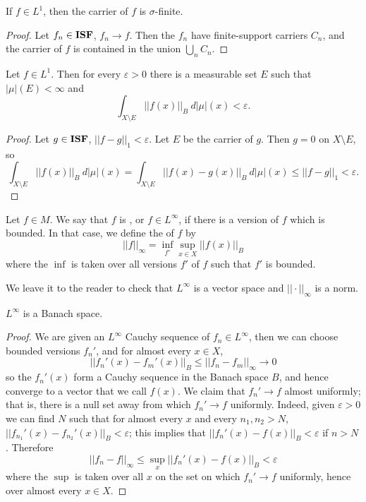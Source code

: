 \begin{lemma}
If $f \in L^1$, then the carrier of $f$ is $\sigma$-finite.
\end{lemma}
\begin{proof}
Let $f_{n} \in \mathbf{ISF}$, $f_{n} \to f$. Then the $f_{n}$ have finite-support carriers $C_{n}$, and the carrier of $f$ is contained in the union $\bigcup_{n} C_{n}$.
\end{proof}

\begin{lemma}
\label{L1 functions almost have finite carrier}
Let $f \in L^1$. Then for every $\varepsilon > 0$ there is a measurable set $E$ such that $|\mu|(E) < \infty$ and
\[\int_{X \setminus E} ||f(x)||_{B} ~d|\mu|(x) < \varepsilon.\]
\end{lemma}
\begin{proof}
Let $g \in \mathbf{ISF}$, $||f - g||_1 < \varepsilon$.
Let $E$ be the carrier of $g$. Then $g = 0$ on $X \setminus E$, so
\[\int_{X \setminus E} ||f(x)||_{B} ~d|\mu|(x) = \int_{X \setminus E} ||f(x) - g(x)||_{B} ~d|\mu|(x) \leq ||f - g||_1 < \varepsilon.\]
\end{proof}

\begin{definition}
Let $f \in M$. We say that $f$ is , or $f \in L^\infty$, if there is a version of $f$ which is bounded.
In that case, we define the  of $f$ by
\[||f||_{\infty} = \inf_{f'} \sup_{x \in X} ||f(x)||_B\]
where the $\inf$ is taken over all versions $f'$ of $f$ such that $f'$ is bounded.
\end{definition}

\begin{subsec}
We leave it to the reader to check that $L^\infty$ is a vector space and $||\cdot||_\infty$ is a norm.
\end{subsec}

\begin{lemma}
$L^\infty$ is a Banach space.
\end{lemma}
\begin{proof}
We are given an $L^\infty$ Cauchy sequence of $f_{n} \in L^\infty$, then we can choose bounded versions $f_{n}'$, and for almost every $x \in X$,
\[||f_{n}'(x) - f_{m}'(x)||_{B} \leq ||f_{n} - f_{m}||_{\infty} \to 0\]
so the $f_{n}'(x)$ form a Cauchy sequence in the Banach space $B$, and hence converge to a vector that we call $f(x)$.
We claim that $f_{n}' \to f$ almost uniformly; that is, there is a null set away from which $f_{n}' \to f$ uniformly.
Indeed, given $\varepsilon > 0$ we can find $N$ such that for almost every $x$ and every $n_1, n_2 > N$, $||f_{n_1}'(x) - f_{n_2}'(x)||_{B} < \varepsilon$; this implies that $||f_{n}'(x) - f(x)||_{B} < \varepsilon$ if $n > N$.
Therefore
\[||f_{n} - f||_{\infty} \leq \sup_{x} ||f_{n}'(x) - f(x)||_{B} < \varepsilon\]
where the $\sup$ is taken over all $x$ on the set on which $f_{n}' \to f$ uniformly, hence over almost every $x \in X$.
\end{proof}

